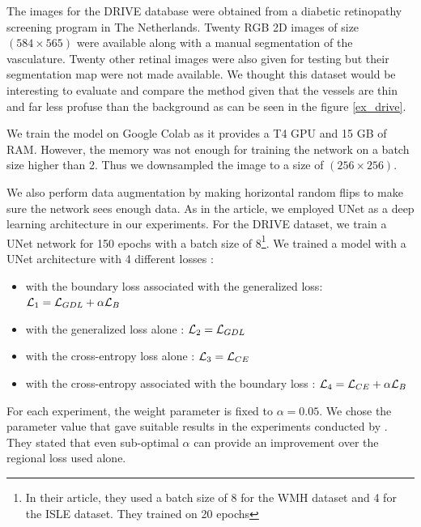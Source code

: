 \documentclass[onecolumn]{article}
\begin{document}
 The images for the DRIVE database were obtained from a diabetic retinopathy screening program in The Netherlands. Twenty RGB 2D images of size $(584 \times 565)$ were available along with a manual segmentation of the vasculature. Twenty other retinal images were also given for testing but their segmentation map were not made available. We thought this dataset would be interesting to evaluate and compare the method given that the vessels are thin and far less profuse than the background as can be seen in the figure \ref{ex_drive}.

We train the model on Google Colab as it provides a T4 GPU and 15 GB of RAM. However, the memory was not enough for training the network on a batch size higher than 2. Thus we downsampled the image to a size of $(256 \times 256)$.

 We also perform data augmentation by making horizontal random flips to make sure the network sees enough data. As in the article, we employed UNet as a deep learning architecture in our experiments. For the DRIVE dataset, we train a UNet network for 150 epochs with a batch size of 8\footnote{In their article, they used a batch size of 8 for the WMH dataset and 4 for the ISLE dataset. They trained on 20 epochs}. We trained a model with a UNet architecture with 4 different losses :
 \begin{itemize}
     \item with the boundary loss associated with the generalized loss: $\mathcal{L}_1 = \mathcal{L}_{GDL} + \alpha \mathcal{L}_{B}$ 
     \item with the generalized loss alone : $\mathcal{L}_2 = \mathcal{L}_{GDL}$
     \item with the cross-entropy loss alone : $\mathcal{L}_3 = \mathcal{L}_{CE}$ 
     \item with the cross-entropy associated with the boundary loss : $\mathcal{L}_4 = \mathcal{L}_{CE}+ \alpha\mathcal{L}_{B}$
 \end{itemize}
For each experiment, the weight parameter is fixed to $\alpha=0.05$. 
We chose the parameter value that gave suitable results in the experiments conducted by \cite{kervadec_boundary_2021}. They stated that even sub-optimal $\alpha$ can provide an improvement over the regional loss used alone. 
\end{document}
